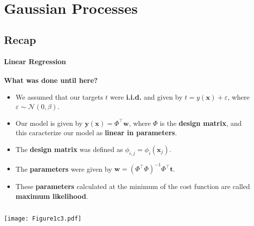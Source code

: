 \section{Gaussian Processes}
\framecard{\insertsection}

\subsection{Recap}
\begin{frame}{\insertsubsection}
    \framesubtitle{Linear Regression} 

    \textcolor{UniGold}{\textbf{What was done until here?}}
    \begin{itemize}
        \item We assumed that our targets $t$ were \textcolor{UniOrange}{\textbf{i.i.d.}} and given by $t = y(\mathbf{x}) + \varepsilon$, where $\varepsilon \sim \mathcal{N}(0,\beta)$.
        \item Our model is given by $\mathbf{y}(\mathbf{x}) = \Phi^{\top} \mathbf{w}$, where $\Phi$ is the \textcolor{UniOrange}{\textbf{design matrix}}, and this caracterize our model as \textcolor{UniOrange}{\textbf{linear in parameters}}.
        \item The \textcolor{UniOrange}{\textbf{design matrix}} was defined as $ \phi_{i,j} = \phi_i(\mathbf{x}_j)$.
        \item The \textcolor{UniOrange}{\textbf{parameters}} were given by $\mathbf{w} = \left( \Phi^{\top} \Phi \right)^{-1}\Phi^{\top} \mathbf{t}$.
        \item These \textcolor{UniOrange}{\textbf{parameters}} calculated at the minimum of the cost function are called \textcolor{UniOrange}{\textbf{maximum likelihood}}.
    \end{itemize}
    \begin{columns}
        \begin{column}{0.5\linewidth}  
        \begin{center}
        \centering
        \texttt{[image: Figure1c3.pdf]}
         \end{center}
    \end{column}
    \begin{column}{0.5\linewidth}  %
        \begin{figure}
            \setlength{}
            
        \end{figure}
    \end{column}
    \end{columns}

\end{frame}

